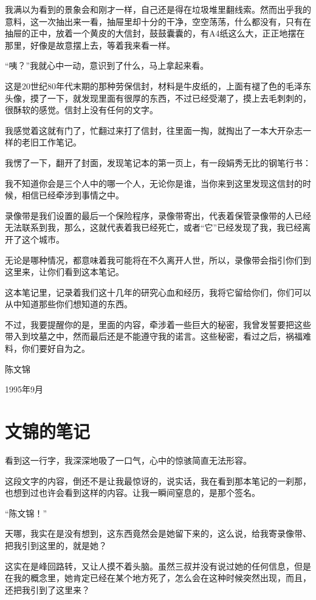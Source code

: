 我满以为看到的景象会和刚才一样，自己还是得在垃圾堆里翻线索。然而出乎我的意料，这一次抽出来一看，抽屉里却十分的干净，空空荡荡，什么都没有，只有在抽屉的正中，放着一个黄皮的大信封，鼓鼓囊囊的，有A4纸这么大，正正地摆在那里，好像是故意摆上去，等着我来看一样。

“咦？”我就心中一动，意识到了什么，马上拿起来看。

这是20世纪80年代末期的那种劳保信封，材料是牛皮纸的，上面有褪了色的毛泽东头像，摸了一下，就发现里面有很厚的东西，不过已经受潮了，摸上去毛刺刺的，很酥软的感觉。信封上没有任何的文字。

我感觉着这就有门了，忙翻过来打了信封，往里面一掏，就掏出了一本大开杂志一样的老旧工作笔记。

我愣了一下，翻开了封面，发现笔记本的第一页上，有一段娟秀无比的钢笔行书：

我不知道你会是三个人中的哪一个人，无论你是谁，当你来到这里发现这信封的时候，相信已经牵涉到事情之中。

录像带是我们设置的最后一个保险程序，录像带寄出，代表着保管录像带的人已经无法联系到我，那么，这就代表着我已经死亡，或者“它”已经发现了我，我已经离开了这个城市。

无论是哪种情况，都意味着我可能将在不久离开人世，所以，录像带会指引你们到这里来，让你们看到这本笔记。

这本笔记里，记录着我们这十几年的研究心血和经历，我将它留给你们，你们可以从中知道那些你们想知道的东西。

不过，我要提醒你的是，里面的内容，牵涉着一些巨大的秘密，我曾发誓要把这些带入到坟墓之中，然而最后还是不能遵守我的诺言。这些秘密，看过之后，祸福难料，你们要好自为之。

陈文锦

1995年9月

\chapter{文锦的笔记}

看到这一行字，我深深地吸了一口气，心中的惊骇简直无法形容。

这段文字的内容，倒还不是让我最惊讶的，说实话，我在看到那本笔记的一刹那，也想到过也许会看到这样的内容。让我一瞬间窒息的，是那个签名。

“陈文锦！”

天哪，我实在是没有想到，这东西竟然会是她留下来的，这么说，给我寄录像带、把我引到这里的，就是她？

这实在是峰回路转，又让人摸不着头脑。虽然三叔并没有说过她的任何信息，但是在我的概念里，她肯定已经在某个地方死了，怎么会在这种时候突然出现，而且，还把我引到了这里来？

